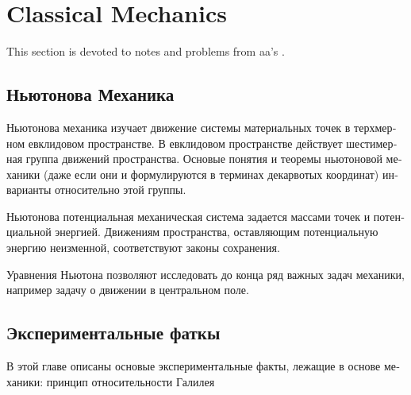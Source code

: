 \chapter{Classical Mechanics}
This section is devoted to notes and problems from aa's \emph{}
\cite{arnold}.

\begin{otherlanguage}{russian}
\section{Ньютонова Механика}
Ньютонова механика изучает движение системы материальных точек в терхмерном
евклидовом пространстве. В евклидовом пространстве действует шестимерная
группа движений пространства. Основые понятия и теоремы ньютоновой механики
(даже если они и формулируются в терминах декарвотых координат) инварианты
относительно этой группы.

Ньютонова потенциальная механическая система задается массами точек и
потенциальной энергией. Движениям пространства, оставляющим потенциальную
энергию неизменной, соответствуют законы сохранения.

Уравнения Ньютона позволяют исследовать до конца ряд важных задач механики,
например задачу о движении в центральном поле.

\section{Экспериментальные фаткы}
В этой главе  описаны основые экспериментальные факты, лежащие в основе
механики: принцип относительности Галилея
\end{otherlanguage}

